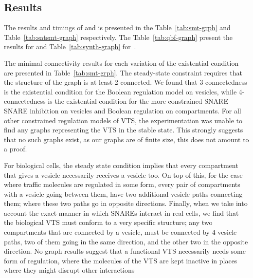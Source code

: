 \subsection{Results}
\noindent The results and timings of {\sattool} and {\smttool} is presented in the Table~\ref{tab:smt-grph} and Table~\ref{tab:satsmt-graph} respectively.
The Table~\ref{tab:qbf-graph} present the results for {\qbftool} and Table~\ref{tab:synth-graph} for~{\ourtool}.




The minimal connectivity results for each variation of the existential condition are presented in Table~\ref{tab:smt-grph}.
%
The steady-state constraint requires that the structure of the graph is at least 2-connected. 
%
We found that 3-connectedness is the existential condition for the Boolean regulation model on vesicles, while 4-connectedness is the existential condition for the more constrained SNARE-SNARE inhibition on vesicles and Boolean regulation on compartments.
%
For all other constrained regulation models of VTS, the experimentation was unable to find any graphs representing the VTS in the stable state.
%
This strongly suggests that no such graphs exist, as our graphs are of finite size, this does not amount to a  proof. 

For biological cells, the steady state condition implies that every compartment that gives a vesicle necessarily receives a vesicle too.
%
On top of this, for the case where traffic molecules are regulated in some form, every pair of compartments with a vesicle going between them, have two additional vesicle paths connecting them; where these two paths go in opposite directions.
%
Finally, when we take into account the exact manner in which SNAREs interact in real cells, we find that the biological VTS must conform to a very specific structure; any two compartments that are connected by a vesicle, must be connected by 4 vesicle paths, two of them going in the same direction, and the other two in the opposite direction. 
%
No graph results suggest that a functional VTS necessarily needs some form of regulation, where the molecules of the VTS are kept inactive in places where they might disrupt other interactions

